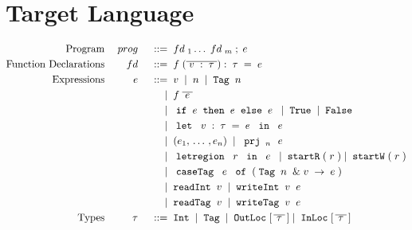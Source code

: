 \documentclass[12pt]{article}
\newcommand{\gramdef}{\; ::= \;}
\newcommand{\gramor}{\; | \;}
\newcommand{\PROG}{\keywd{prog}}
\newcommand{\EXPR}{\keywd{e}}
\newcommand{\TYP}{\keywd{\tau}}
\newcommand{\FD}{\keywd{fd}}
\newcommand{\keywd}[1]{\; {#1} \;}
\newcommand{\gramwd}[1]{\; \texttt{#1} \;}
\newcommand{\var}{\; \svar \;}
\newcommand{\svar}{v}
\newcommand{\fvar}{\; \sfvar \;}
\newcommand{\sfvar}{f}
\newcommand{\num}{\; n \;}
\newcommand{\letexpr}[3]{\;\gramwd{let} \; #1 = #2 \; \gramwd{in} \; #3 \;}
\newcommand{\ife}[3]{\; \gramwd{if}#1\gramwd{then}#2\gramwd{else}#3 \;}
\newcommand{\project}[2]{\; \gramwd{prj}_{#1}\,{#2}\;}
\newcommand{\letregion}[2]{\; \gramwd{letregion}\;#1\; \gramwd{in}\; #2 \;}
\newcommand{\REG}{\keywd{r}}
\newcommand{\casetag}[3]{\; \gramwd{caseTag}\;#1\;\gramwd{of}\;(#2 \rightarrow #3)\;}
\begin{document}
\section{Target Language}

\begin{displaymath}
  \begin{aligned}
      \textup{Program} && \PROG && \gramdef & \FD_1 \ldots \FD_m \; ; \EXPR \\
      \textup{Function Declarations} && \FD && \gramdef & \fvar(\overline{\var:\TYP}) : \TYP = \EXPR \\
      \textup{Expressions} && \EXPR && \gramdef & \var \gramor \num \gramor \gramwd{Tag}\num \\
      && && \gramor & \fvar \overline{\EXPR} \\
      && && \gramor & \ife{\EXPR}{\EXPR}{\EXPR} \gramor \gramwd{True} \gramor \gramwd{False} \\
      && && \gramor & \letexpr{\var:\TYP}{\EXPR}{\EXPR} \\
      && && \gramor & \;(e_1,\, \dots\, , e_n)\; \gramor \project{\num}{\EXPR} \\
      && && \gramor & \letregion{\REG}{\EXPR} \gramor \gramwd{startR}(\REG) \gramor \gramwd{startW}(\REG) \\
      && && \gramor & \casetag{\EXPR}{\gramwd{Tag}\num \;\& \var}{\EXPR} \\
      && && \gramor & \gramwd{readInt} \var \gramor \gramwd{writeInt} \var \EXPR \\
      && && \gramor & \gramwd{readTag} \var \gramor \gramwd{writeTag} \var \EXPR \\
      \textup{Types} && \TYP && \gramdef & \gramwd{Int} \gramor \gramwd{Tag} \gramor \gramwd{OutLoc} [\,\overline{\TYP}\,] \gramor \gramwd{InLoc} [\,\overline{\TYP}\,]
  \end{aligned}
\end{displaymath}
\end{document}

